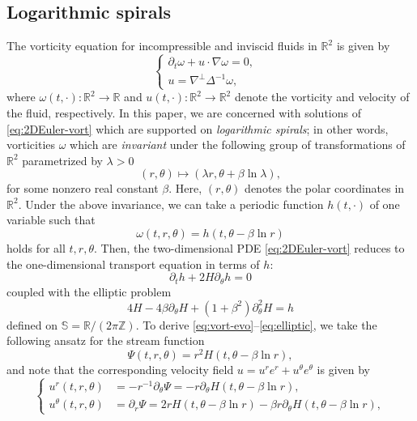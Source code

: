 \documentclass[10pt]{amsart}
\theoremstyle{plain}
\theoremstyle{definition}
\let\lap\Delta
\let\rd\partial
\let\nb\nabla
\let\bt\beta
\let\lmb\lambda
\let\tht\theta
\let\omg\omega
\newcommand{\bbR}{\mathbb R}
\newcommand{\bbS}{\mathbb S}
\newcommand{\bbZ}{\mathbb Z}
\begin{document}
\subsection{Logarithmic spirals}
The vorticity equation for incompressible and inviscid fluids in $\bbR^2$ is given by
\begin{equation}\label{eq:2DEuler-vort}
\left\{
\begin{aligned}
\rd_t\omg + u\cdot\nb \omg = 0, & \\
u = \nb^\perp \lap^{-1}\omg, &
\end{aligned}
\right.
\end{equation}
where $\omg(t,\cdot):\bbR^2\to\bbR$ and $u(t,\cdot):\bbR^2\to\bbR^{2}$ denote the vorticity and velocity of the fluid, respectively. In this paper, we are concerned with solutions of \eqref{eq:2DEuler-vort} which are supported on \textit{logarithmic spirals}; in other words, vorticities $\omg$ which are \textit{invariant} under the following group of transformations of $\bbR^{2}$ parametrized by $\lmb>0$
\begin{equation*}
(r,\tht) \mapsto (\lmb r, \tht + \beta\ln \lmb),
\end{equation*}
for some nonzero real constant $\bt$. Here, $(r,\tht)$ denotes the polar coordinates in $\bbR^2$. Under the above invariance, we can take a periodic function $h(t,\cdot)$ of one variable such that
\begin{equation}\label{eq:vort-homog-spi}
\omg(t,r,\tht) = h(t, \tht - \beta \ln r)
\end{equation}
holds for all $t, r, \tht$. Then, the two-dimensional PDE \eqref{eq:2DEuler-vort} reduces to the one-dimensional transport equation in terms of $h$:
\begin{equation}\label{eq:vort-evo}
\rd_t h + 2H \rd_\tht h = 0
\end{equation}
coupled with the elliptic problem
\begin{equation}\label{eq:elliptic}
4H-4\beta \partial_{\theta} H + (1+\beta^2)\partial^2_{\theta} H = h
\end{equation}
defined on $\bbS = \bbR/(2\pi\bbZ)$. To derive \eqref{eq:vort-evo}--\eqref{eq:elliptic}, we take the following ansatz for the stream function
\begin{equation}\label{eq:stream-homog}
\Psi(t,r,\tht) = r^2 H(t, \tht - \beta \ln r),
\end{equation}
and note that the corresponding velocity field $u = u^re^r+u^\tht e^\tht$ is given by
\begin{equation}\label{eq:vel-homog}
\left\{
\begin{aligned}
u^r(t,r,\tht) & = -r^{-1}\rd_\tht\Psi = - r\partial_{\theta} H(t, \tht - \beta \ln r), \\
u^\tht(t,r,\tht) & = \rd_r\Psi = 2rH(t, \tht - \beta \ln r) - \bt r \partial_{\theta} H(t, \tht - \beta \ln r),
\end{aligned}
\right.
\end{equation}
\end{document}
